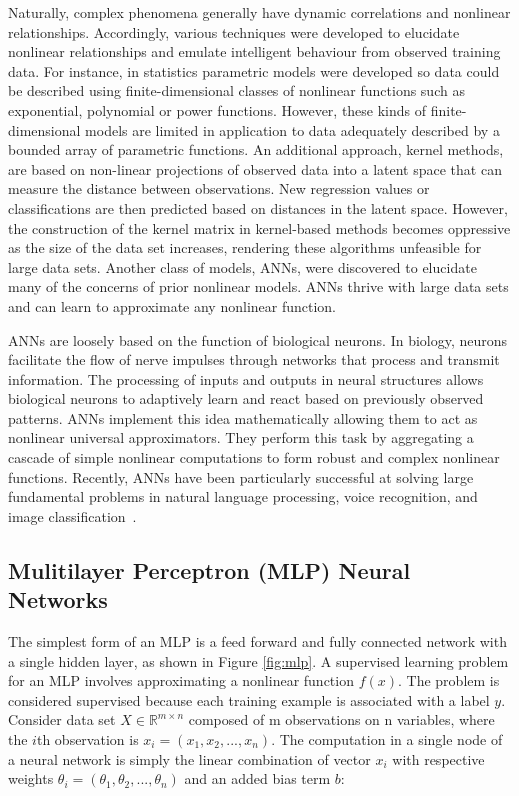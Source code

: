 Naturally, complex phenomena generally have dynamic correlations and nonlinear relationships. Accordingly, various techniques were developed to elucidate nonlinear relationships and emulate intelligent behaviour from observed training data. For instance, in statistics parametric models were developed so data could be described using finite-dimensional classes of nonlinear functions such as exponential, polynomial or power functions. However, these kinds of finite-dimensional models are limited in application to data adequately described by a bounded array of parametric functions. An additional approach, kernel methods, are based on non-linear projections of observed data into a latent space that can measure the distance between observations. New regression values or classifications are then predicted based on distances in the latent space. However, the construction of the kernel matrix in kernel-based methods becomes oppressive as the size of the data set increases, rendering these algorithms unfeasible for large data sets. Another class of models, ANNs, were discovered to elucidate many of the concerns of prior nonlinear models. ANNs thrive with large data sets and can learn to approximate any nonlinear function.

ANNs are loosely based on the function of biological neurons. In biology, neurons facilitate the flow of nerve impulses through networks that process and transmit information. The processing of inputs and outputs in neural structures allows biological neurons to adaptively learn and react based on previously observed patterns. ANNs implement this idea mathematically allowing them to act as nonlinear universal approximators. They perform this task by aggregating a cascade of simple nonlinear computations to form robust and complex nonlinear functions. Recently, ANNs have been particularly successful at solving large fundamental problems in natural language processing, voice recognition, and image classification~\cite{collobert2011natural, hinton2012deep, cirecsan2012multi}. 

\subsection{Mulitilayer Perceptron (MLP) Neural Networks}

The simplest form of an MLP is a feed forward and fully connected network with a single hidden layer, as shown in Figure \ref{fig:mlp}. A supervised learning problem for an MLP involves approximating a nonlinear function $f(x)$. The problem is considered supervised because each training example is associated with a label $y$. Consider data set $X \in \mathbb{R}^{m\times n} $ composed of m observations on n variables, where the $i$th observation is $x_i = (x_1,x_2,...,x_n)$. The computation in a single node of a neural network is simply the linear combination of vector $x_i$ with respective weights $\theta_i = (\theta_1,\theta_2,...,\theta_n)$ and an added bias term $b$:

